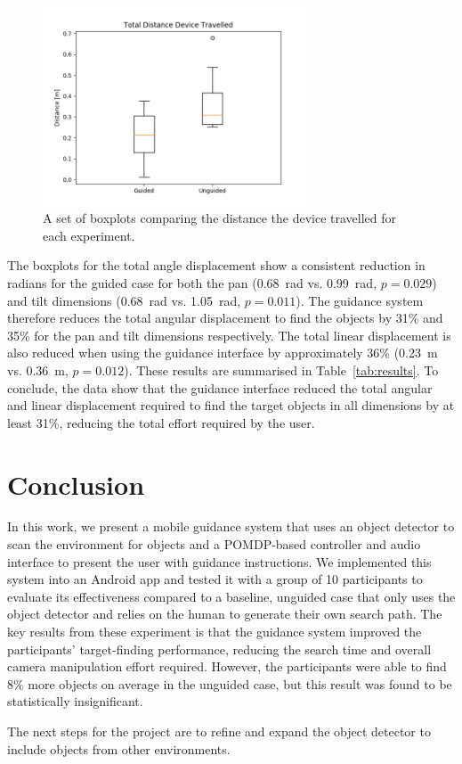\documentclass[runningheads]{llncs}
\begin{document}
\begin{figure}
  \centering
  \includegraphics[width=0.7\textwidth]{figures/boxplot_dist.png}
  \caption{A set of boxplots comparing the distance the device travelled for each experiment. }\label{fig:boxplot-dist}
\end{figure}

The boxplots for the total angle displacement show a consistent reduction in radians for the guided case for both the pan (\SI{0.68}{\radian} vs. \SI{0.99}{\radian}, $p=0.029$) and tilt dimensions (\SI{0.68}{\radian} vs. \SI{1.05}{\radian}, $p=0.011$). 
The guidance system therefore reduces the total angular displacement to find the objects by 31\% and 35\% for the pan and tilt dimensions respectively. 
The total linear displacement is also reduced when using the guidance interface by approximately 36\% (\SI{0.23}{\metre} vs. \SI{0.36}{\metre}, $p=0.012$).
These results are summarised in Table~\ref{tab:results}.
To conclude, the data show that the guidance interface reduced the total angular and linear displacement required to find the target objects in all dimensions by at least 31\%, reducing the total effort required by the user. 

\section{Conclusion}\label{sec:conclusion}

In this work, we present a mobile guidance system that uses an object detector to scan the environment for objects and a POMDP-based controller and audio interface to present the user with guidance instructions. 
We implemented this system into an Android app and tested it with a group of 10 participants to evaluate its effectiveness compared to a baseline, unguided case that only uses the object detector and relies on the human to generate their own search path. 
The key results from these experiment is that the guidance system improved the participants' target-finding performance, reducing the search time and overall camera manipulation effort required.
However, the participants were able to find 8\% more objects on average in the unguided case, but this result was found to be statistically insignificant. 

The next steps for the project are to refine and expand the object detector to include objects from other environments. 



\end{document}
